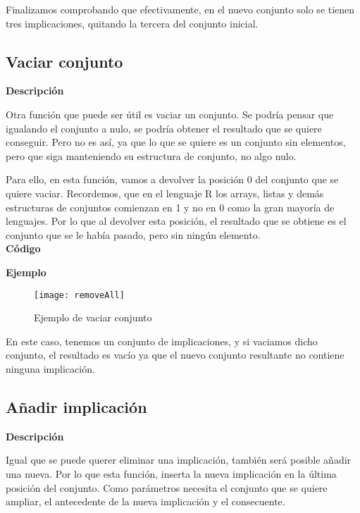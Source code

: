     Finalizamos comprobando que efectivamente, en el nuevo conjunto solo se tienen tres implicaciones, quitando la tercera del conjunto 
    inicial.



\subsection{Vaciar conjunto}

    \textbf{Descripci\'on}

    Otra funci\'on que puede ser \'util es vaciar un conjunto. Se podr\'ia pensar que igualando el conjunto a nulo, 
    se podr\'ia obtener el resultado que se quiere conseguir. Pero no es as\'i, ya que lo que se quiere es un conjunto sin 
    elementos, pero que siga manteniendo su estructura de conjunto, no algo nulo. 
    
    Para ello, en esta funci\'on, vamos a devolver la posici\'on 0 del conjunto que se quiere vaciar. Recordemos, que en el 
    lenguaje R los arrays, listas y dem\'as estructuras de conjuntos comienzan en 1 y no en 0 como la gran mayor\'ia de lenguajes.
    Por lo que al devolver esta posici\'on, el resultado que se obtiene es el conjunto que se le hab\'ia pasado, pero sin ning\'un 
    elemento.
    \\


    \textbf{C\'odigo}

    
    \bigskip

    \textbf{Ejemplo}

    \begin{figure}[H]
        \centering
        \texttt{[image: removeAll]}
        \caption{Ejemplo de vaciar conjunto}
        \label{fig:removeAll}
    \end{figure}

    En este caso, tenemos un conjunto de implicaciones, y si vaciamos dicho conjunto, el resultado es vac\'io ya que el nuevo 
    conjunto resultante no contiene ninguna implicaci\'on.



\subsection{A\~nadir implicaci\'on}

    \textbf{Descripci\'on}

    Igual que se puede querer eliminar una implicaci\'on, tambi\'en ser\'a posible a\~nadir una nueva. Por lo que esta funci\'on, 
    inserta la nueva implicaci\'on en la \'ultima posici\'on del conjunto. Como par\'ametros necesita el conjunto que se quiere ampliar, 
    el antecedente de la nueva implicaci\'on y el consecuente.

